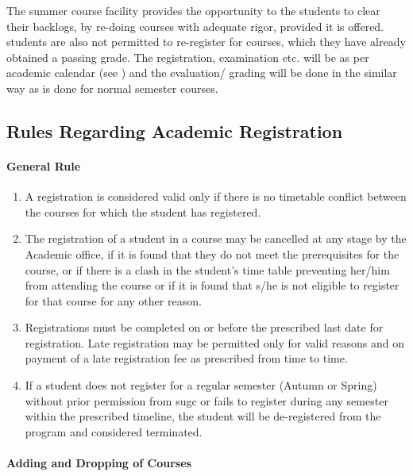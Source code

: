    The summer course facility provides the opportunity to the \glspl{student} to clear their backlogs, by re-doing courses with adequate rigor, provided it is offered. \Glspl{student} are also not permitted to re-register for courses, which they have already obtained a passing grade. The registration, examination etc. will be as per academic calendar (see ) and the evaluation/ grading will be done in the similar way as is done for normal semester courses. 

\subsection{Rules Regarding Academic Registration}

\paragraph{General Rule}

\begin{enumerate}[leftmargin=15mm]
    \item A registration is considered valid only if there is no timetable conflict between the courses for which the \gls{student} has registered. 
    \item The registration of a \gls{student} in a course may be cancelled at any stage by the Academic office, if it is found that they do not meet the prerequisites for the course, or if there is a clash in the \gls{student}'s time table preventing her/him from attending the course or if it is found that s/he is not eligible to register for that course for any other reason.
    \item Registrations must be completed on or before the prescribed last date for registration. Late registration may be permitted only for valid reasons and on payment of a late registration fee as prescribed from time to time. 
    \item If a \gls{student} does not register for a regular semester (Autumn or Spring) without prior permission from \acrshort{sugc} or fails to register during any semester within the prescribed timeline, the \gls{student} will be de-registered from the program and considered terminated.
\end{enumerate}

\paragraph{Adding and Dropping of Courses} 

